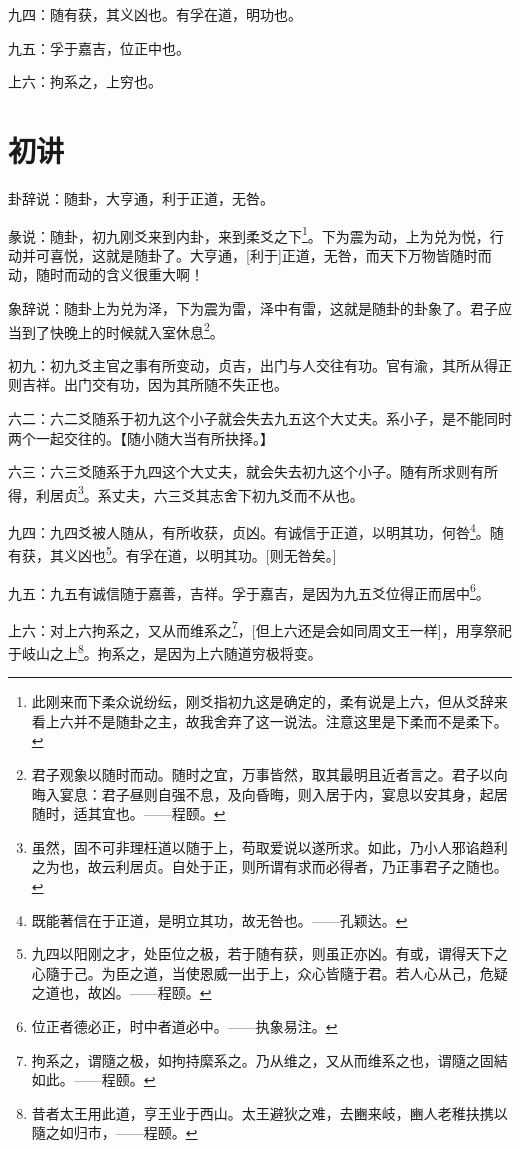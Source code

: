 \documentclass[12pt,oneside]{book}
\begin{document}
九四：随有获，其义凶也。有孚在道，明功也。

九五：孚于嘉吉，位正中也。

上六：拘系之，上穷也。


\section{初讲}
卦辞说：随卦，大亨通，利于正道，无咎。

彖说：随卦，初九刚爻来到内卦，来到柔爻之下\footnote{此刚来而下柔众说纷纭，刚爻指初九这是确定的，柔有说是上六，但从爻辞来看上六并不是随卦之主，故我舍弃了这一说法。注意这里是下柔而不是柔下。}。下为震为动，上为兑为悦，行动并可喜悦，这就是随卦了。大亨通，[利于]正道，无咎，而天下万物皆随时而动，随时而动的含义很重大啊！

象辞说：随卦上为兑为泽，下为震为雷，泽中有雷，这就是随卦的卦象了。君子应当到了快晚上的时候就入室休息\footnote{君子观象以随时而动。随时之宜，万事皆然，取其最明且近者言之。君子以向晦入宴息：君子昼则自强不息，及向昏晦，则入居于内，宴息以安其身，起居随时，适其宜也。——程颐。}。

初九：初九爻主官之事有所变动，贞吉，出门与人交往有功。官有渝，其所从得正则吉祥。出门交有功，因为其所随不失正也。

六二：六二爻随系于初九这个小子就会失去九五这个大丈夫。系小子，是不能同时两个一起交往的。【随小随大当有所抉择。】

六三：六三爻随系于九四这个大丈夫，就会失去初九这个小子。随有所求则有所得，利居贞\footnote{虽然，固不可非理枉道以随于上，苟取爱说以遂所求。如此，乃小人邪谄趋利之为也，故云利居贞。自处于正，则所谓有求而必得者，乃正事君子之随也。}。系丈夫，六三爻其志舍下初九爻而不从也。

九四：九四爻被人随从，有所收获，贞凶。有诚信于正道，以明其功，何咎\footnote{既能著信在于正道，是明立其功，故无咎也。——孔颖达。}。随有获，其义凶也\footnote{九四以阳刚之才，处臣位之极，若于随有获，则虽正亦凶。有或，谓得天下之心隨于己。为臣之道，当使恩威一出于上，众心皆隨于君。若人心从己，危疑之道也，故凶。——程颐。}。有孚在道，以明其功。[则无咎矣。]

九五：九五有诚信随于嘉善，吉祥。孚于嘉吉，是因为九五爻位得正而居中\footnote{位正者德必正，时中者道必中。——执象易注。}。

上六：对上六拘系之，又从而维系之\footnote{拘系之，谓隨之极，如拘持縻系之。乃从维之，又从而维系之也，谓隨之固結如此。——程颐。}，[但上六还是会如同周文王一样]，用享祭祀于岐山之上\footnote{昔者太王用此道，亨王业于西山。太王避狄之难，去豳来岐，豳人老稚扶携以隨之如归市，——程颐。}。拘系之，是因为上六随道穷极将变。
\end{document}
